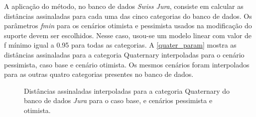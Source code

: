 A aplicação do método, no banco de dados \textit{Swiss Jura}, consiste em calcular as distâncias assinaladas para cada uma das cinco categorias do banco de dados. Os parâmetros \textit{fmin} para os cenários otimista e pessimista usados na modificação do suporte devem ser escolhidos. Nesse caso, usou-se um modelo linear com valor de f mínimo igual a 0.95 para todas as categorias. A \autoref{quater_param} mostra as distâncias assinaladas para a categoria Quaternary interpoladas para o cenário pessimista, caso base e cenário otimista. Os mesmos cenários foram interpolados para as outras quatro categorias presentes no banco de dados.

\begin{figure}[H] 
    \centering
    \caption{Distâncias assinaladas interpoladas para a categoria Quaternary do banco de dados \textit{Jura} para o caso base, e cenários pessimista e otimista.} \label{quater_param}
     \hspace{1em}
     \hspace{1em}
\end{figure}


